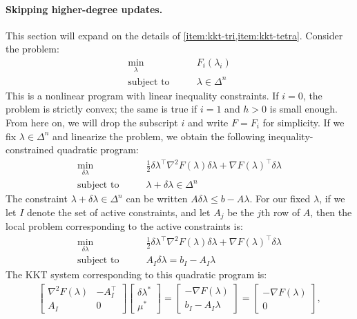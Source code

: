 \documentclass[eikonal.tex]{subfiles}
\begin{document}
\paragraph{Skipping higher-degree updates.} This section will expand
on the details of \cref{item:kkt-tri,item:kkt-tetra}. Consider the
problem:
\begin{align*}
  \min_{\lambda} &\qquad F_i(\lambda_i) \\
  \text{subject to} &\qquad \lambda \in \Delta^n
\end{align*}
This is a nonlinear program with linear inequality constraints. If
$i = 0$, the problem is strictly convex; the same is true if $i = 1$
and $h > 0$ is small enough. From here on, we will drop the subscript
$i$ and write $F = F_i$ for simplicity. If we fix
$\lambda \in \Delta^n$ and linearize the problem, we obtain the
following inequality-constrained quadratic program:
\begin{align*}
  \min_{\delta\lambda} &\qquad \frac{1}{2} \delta\lambda^\top \nabla^2 F(\lambda) \delta\lambda + \nabla F(\lambda)^\top \delta\lambda \\
  \text{subject to} &\qquad \lambda + \delta\lambda \in \Delta^n
\end{align*}
The constraint $\lambda + \delta\lambda \in \Delta^n$ can be written
$A\delta\lambda \leq b - A\lambda$. For our fixed $\lambda$, if we let
$I$ denote the set of active constraints, and let $A_j$ be the $j$th
row of $A$, then the local problem corresponding to the active
constraints is:
\begin{align*}
  \min_{\delta\lambda} &\qquad \frac{1}{2} \delta\lambda^\top \nabla^2 F(\lambda) \delta\lambda + \nabla F(\lambda)^\top \delta\lambda \\
  \text{subject to} &\qquad A_I \delta\lambda = b_I - A_I\lambda
\end{align*}
The KKT system corresponding to this quadratic program is:
\begin{align*}
  \begin{bmatrix}
    \nabla^2 F(\lambda) & -A_I^\top \\
    A_I & 0
  \end{bmatrix} \begin{bmatrix}
    \delta \lambda^* \\
    \mu^*
  \end{bmatrix} = \begin{bmatrix}
    -\nabla F(\lambda) \\
    b_I - A_I\lambda
  \end{bmatrix} = \begin{bmatrix}
    -\nabla F(\lambda) \\
    0
  \end{bmatrix},
\end{align*}
\end{document}
